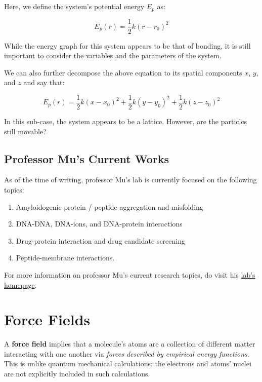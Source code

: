 \documentclass[
  letterpaper,
  DIV=11,
  numbers=noendperiod]{scrreprt}
\providecommand{\tightlist}{%
  \setlength{\itemsep}{0pt}\setlength{\parskip}{0pt}}\usepackage{longtable,booktabs,array}
\begin{document}
Here, we define the system's potential energy \(E_p\) as:

\begin{equation}
  E_p(r) = \frac{1}{2}k(r - r_0)^2
\end{equation}

While the energy graph for this system appears to be that of bonding, it
is still important to consider the variables and the parameters of the
system.

We can also further decompose the above equation to its spatial
components \(x\), \(y\), and \(z\) and say that:

\begin{equation}
E_p(r) = \frac{1}{2}k(x - x_0)^2 + \frac{1}{2}k(y - y_0)^2 + \frac{1}{2}k(z - z_0)^2
\end{equation}

In this sub-case, the system appears to be a lattice. However, are the
particles still movable?

\hypertarget{professor-mus-current-works}{%
\section{Professor Mu's Current
Works}\label{professor-mus-current-works}}

As of the time of writing, professor Mu's lab is currently focused on
the following topics:

\begin{enumerate}
\def\labelenumi{\arabic{enumi}.}
\tightlist
\item
  Amyloidogenic protein / peptide aggregation and misfolding
\item
  DNA-DNA, DNA-ions, and DNA-protein interactions
\item
  Drug-protein interaction and drug candidate screening
\item
  Peptide-membrane interactions.
\end{enumerate}

For more information on professor Mu's current research topics, do visit
his
\href{https://www.ntu.edu.sg/sbs/research/research-directory/Mu-Yuguang}{lab's
homepage}.

\hypertarget{force-fields}{%
\chapter{Force Fields}\label{force-fields}}

A \textbf{force field} implies that a molecule's atoms are a collection
of different matter interacting with one another via \emph{forces
described by empirical energy functions}. This is unlike quantum
mechanical calculations: the electrons and atoms' nuclei are not
explicitly included in such calculations.
\end{document}
